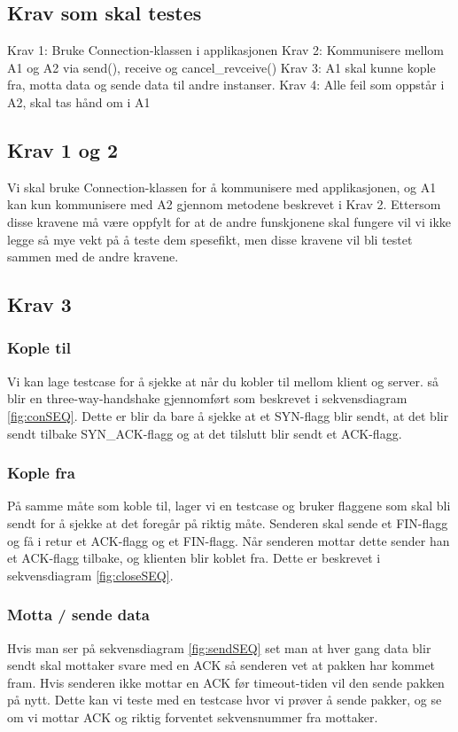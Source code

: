 \subsection{Krav som skal testes}
Krav 1: Bruke Connection-klassen i applikasjonen
Krav 2: Kommunisere mellom A1 og A2 via send(), receive og cancel\_revceive()
Krav 3: A1 skal kunne kople fra, motta data og sende data til andre instanser.
Krav 4: Alle feil som oppstår i A2, skal tas hånd om i A1

\subsection{Krav 1 og 2}
Vi skal bruke Connection-klassen for å kommunisere med applikasjonen, og A1 kan kun kommunisere med A2 gjennom metodene beskrevet i Krav 2. 
Ettersom disse kravene må være oppfylt for at de andre funskjonene skal fungere vil vi ikke legge så mye vekt på å teste dem spesefikt, men disse kravene vil bli testet sammen med de andre kravene.

\subsection{Krav 3}
\subsubsection{Kople til}
Vi kan lage testcase for å sjekke at når du kobler til mellom klient og server. så blir en three-way-handshake gjennomført som beskrevet i sekvensdiagram \ref{fig:conSEQ}. Dette er blir da bare å sjekke at et SYN-flagg blir sendt, at det blir sendt tilbake SYN\_ACK-flagg og at det tilslutt blir sendt et ACK-flagg.

\subsubsection{Kople fra}
På samme måte som koble til, lager vi en testcase og bruker flaggene som skal bli sendt for å sjekke at det foregår på riktig måte. Senderen skal sende et FIN-flagg og få i retur et ACK-flagg og et FIN-flagg. Når senderen mottar dette sender han et ACK-flagg tilbake, og klienten blir koblet fra. Dette er beskrevet i sekvensdiagram \ref{fig:closeSEQ}.

\subsubsection{Motta / sende data}
Hvis man ser på sekvensdiagram \ref{fig:sendSEQ} set man at hver gang data blir sendt skal mottaker svare med en ACK så senderen vet at pakken har kommet fram. Hvis senderen ikke mottar en ACK før timeout-tiden vil den sende pakken på nytt. Dette kan vi teste med en testcase hvor vi prøver å sende pakker, og se om vi mottar ACK og riktig forventet sekvensnummer fra mottaker.

